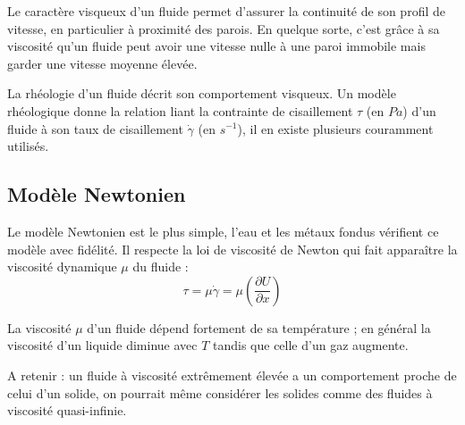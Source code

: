 Le caractère visqueux d'un fluide permet d'assurer la continuité de son profil de vitesse, en particulier à proximité des parois. En quelque sorte, c'est grâce à sa viscosité qu'un fluide peut avoir une vitesse nulle à une paroi immobile mais garder une vitesse moyenne élevée.

La rhéologie d'un fluide décrit son comportement visqueux. Un modèle rhéologique donne la relation liant la contrainte de cisaillement $\tau$ (en $Pa$) d'un fluide à son taux de cisaillement $\dot{\gamma}$ (en $s^{-1}$), il en existe plusieurs couramment utilisés.

\subsection{Modèle Newtonien}

Le modèle Newtonien est le plus simple, l'eau et les métaux fondus vérifient ce modèle avec fidélité. Il respecte la loi de viscosité de Newton qui fait apparaître la viscosité dynamique $\mu$ du fluide :
%
\begin{equation}
\tau = \mu \dot{\gamma} = \mu \left( \frac{\partial U}{\partial x} \right)
\end{equation}

La viscosité $\mu$ d'un fluide dépend fortement de sa température ; en général la viscosité d'un liquide diminue avec $T$ tandis que celle d'un gaz augmente.

A retenir : un fluide à viscosité extrêmement élevée a un comportement proche de celui d'un solide, on pourrait même considérer les solides comme des fluides à viscosité quasi-infinie.
